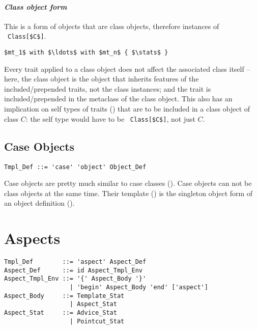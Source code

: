 \paragraph{\em Class object form}
This is a form of objects that are class objects, therefore instances of ~\lstinline!Class[$C$]!. 
\begin{lstlisting}
$mt_1$ with $\ldots$ with $mt_n$ { $\stats$ }
\end{lstlisting}

Every trait applied to a class object does not affect the associated class itself -- here, the class object is the object that inherits features of the included/prepended traits, not the class instances; and the trait is included/prepended in the metaclass of the class object. This also has an implication on self types of traits () that are to be included in a class object of class $C$: the self type would have to be ~\lstinline!Class[$C$]!, not just $C$. 

\subsection{Case Objects}
\label{sec:case-objects}

\syntax\begin{lstlisting}
Tmpl_Def ::= 'case' 'object' Object_Def
\end{lstlisting}

Case objects are pretty much similar to case classes (). Case objects can not be class objects at the same time. Their template () is the singleton object form of an object definition (). 






\section{Aspects}
\label{sec:aspects}

\syntax\begin{lstlisting}
Tmpl_Def        ::= 'aspect' Aspect_Def
Aspect_Def      ::= id Aspect_Tmpl_Env
Aspect_Tmpl_Env ::= '{' Aspect_Body '}'
                  | 'begin' Aspect_Body 'end' ['aspect']
Aspect_Body     ::= Template_Stat 
                  | Aspect_Stat
Aspect_Stat     ::= Advice_Stat
                  | Pointcut_Stat
\end{lstlisting}





